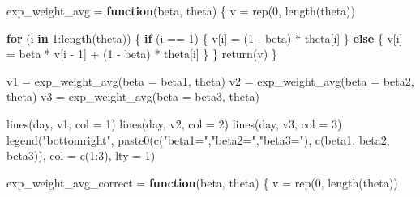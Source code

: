 \documentclass[
  12pt,
]{krantz}
\makeatletter
\newenvironment{Shaded}{\begin{snugshade}}{\end{snugshade}}
\newcommand{\AttributeTok}[1]{\textcolor[rgb]{0.61,0.61,0.61}{#1}}
\newcommand{\ControlFlowTok}[1]{\textcolor[rgb]{0.27,0.27,0.27}{\textbf{#1}}}
\newcommand{\DecValTok}[1]{\textcolor[rgb]{0.06,0.06,0.06}{#1}}
\newcommand{\FunctionTok}[1]{\textcolor[rgb]{0,0,0}{#1}}
\newcommand{\NormalTok}[1]{#1}
\newcommand{\OtherTok}[1]{\textcolor[rgb]{0.37,0.37,0.37}{#1}}
\newcommand{\SpecialCharTok}[1]{\textcolor[rgb]{0,0,0}{#1}}
\newcommand{\StringTok}[1]{\textcolor[rgb]{0.5,0.5,0.5}{#1}}
\newenvironment{kframe}{%
\medskip{}
\setlength{\fboxsep}{.8em}
 \def\at@end@of@kframe{}%
 \ifinner\ifhmode%
  \def\at@end@of@kframe{\end{minipage}}%
  \begin{minipage}{\columnwidth}%
 \fi\fi%
 \def\FrameCommand##1{\hskip\@totalleftmargin \hskip-\fboxsep
 \colorbox{shadecolor}{##1}\hskip-\fboxsep
     \hskip-\linewidth \hskip-\@totalleftmargin \hskip\columnwidth}%
 \MakeFramed {\advance\hsize-\width
   \@totalleftmargin\z@ \linewidth\hsize
   \@setminipage}}%
 {\par\unskip\endMakeFramed%
 \at@end@of@kframe}
\renewenvironment{Shaded}{\begin{kframe}}{\end{kframe}}
\makeatother
\begin{document}
\begin{Shaded}
\begin{Highlighting}[]
\NormalTok{exp\_weight\_avg }\OtherTok{=} \ControlFlowTok{function}\NormalTok{(beta, theta) \{}
\NormalTok{  v }\OtherTok{=} \FunctionTok{rep}\NormalTok{(}\DecValTok{0}\NormalTok{, }\FunctionTok{length}\NormalTok{(theta))}

  \ControlFlowTok{for}\NormalTok{ (i }\ControlFlowTok{in} \DecValTok{1}\SpecialCharTok{:}\FunctionTok{length}\NormalTok{(theta)) \{}
    \ControlFlowTok{if}\NormalTok{ (i }\SpecialCharTok{==} \DecValTok{1}\NormalTok{) \{}
\NormalTok{      v[i] }\OtherTok{=}\NormalTok{ (}\DecValTok{1} \SpecialCharTok{{-}}\NormalTok{ beta) }\SpecialCharTok{*}\NormalTok{ theta[i]}
\NormalTok{    \} }\ControlFlowTok{else}\NormalTok{ \{}
\NormalTok{      v[i] }\OtherTok{=}\NormalTok{ beta }\SpecialCharTok{*}\NormalTok{ v[i }\SpecialCharTok{{-}} \DecValTok{1}\NormalTok{] }\SpecialCharTok{+}\NormalTok{ (}\DecValTok{1} \SpecialCharTok{{-}}\NormalTok{ beta) }\SpecialCharTok{*}\NormalTok{ theta[i]}
\NormalTok{    \}}
\NormalTok{  \}}
  \FunctionTok{return}\NormalTok{(v)}
\NormalTok{\}}

\NormalTok{v1 }\OtherTok{=} \FunctionTok{exp\_weight\_avg}\NormalTok{(}\AttributeTok{beta =}\NormalTok{ beta1, theta)}
\NormalTok{v2 }\OtherTok{=} \FunctionTok{exp\_weight\_avg}\NormalTok{(}\AttributeTok{beta =}\NormalTok{ beta2, theta)}
\NormalTok{v3 }\OtherTok{=} \FunctionTok{exp\_weight\_avg}\NormalTok{(}\AttributeTok{beta =}\NormalTok{ beta3, theta)}

\FunctionTok{lines}\NormalTok{(day, v1, }\AttributeTok{col =} \DecValTok{1}\NormalTok{)}
\FunctionTok{lines}\NormalTok{(day, v2, }\AttributeTok{col =} \DecValTok{2}\NormalTok{)}
\FunctionTok{lines}\NormalTok{(day, v3, }\AttributeTok{col =} \DecValTok{3}\NormalTok{)}
\FunctionTok{legend}\NormalTok{(}\StringTok{"bottomright"}\NormalTok{,}
       \FunctionTok{paste0}\NormalTok{(}\FunctionTok{c}\NormalTok{(}\StringTok{"beta1="}\NormalTok{,}\StringTok{"beta2="}\NormalTok{,}\StringTok{"beta3="}\NormalTok{),}
              \FunctionTok{c}\NormalTok{(beta1, beta2, beta3)), }\AttributeTok{col =} \FunctionTok{c}\NormalTok{(}\DecValTok{1}\SpecialCharTok{:}\DecValTok{3}\NormalTok{),}
       \AttributeTok{lty =} \DecValTok{1}\NormalTok{)}

\NormalTok{exp\_weight\_avg\_correct }\OtherTok{=} \ControlFlowTok{function}\NormalTok{(beta, theta) \{}
\NormalTok{  v }\OtherTok{=} \FunctionTok{rep}\NormalTok{(}\DecValTok{0}\NormalTok{, }\FunctionTok{length}\NormalTok{(theta))}


\end{Highlighting}
\end{Shaded}
\end{document}
